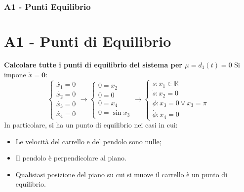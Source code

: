\documentclass{beamer}
\begin{document}
\begin{frame}
	\frametitle{A1 - Punti Equilibrio}%
	\section{A1 - Punti di Equilibrio}%
	\textbf{Calcolare tutte i punti di equilibrio del sistema per \(\mu = d_{1}{(t)} = 0\)}
	Si impone \(\dot{x}=\textbf{0}\):
	\begin{equation*}
		\begin{cases}
			\dot{x_{1}}=0 \\
			\dot{x_{2}}=0 \\
			\dot{x_{3}}=0 \\
			\dot{x_{4}}=0
		\end{cases}
		\rightarrow
		\begin{cases}
			0=x_{2} \\
			0=0     \\
			0=x_{4} \\
			0=\sin{x_{3}}
		\end{cases}
		\rightarrow
		\begin{cases}
			s:x_{1}\in\mathbb{R}        \\
			\dot{s}:x_{2}=0             \\
			\phi:x_{3}=0 \lor x_{3}=\pi \\%
			\dot{\phi}:x_{4}=0
		\end{cases}
	\end{equation*}
	In particolare, si ha un punto di equilibrio nei casi in cui:\begin{itemize}
		\item Le velocità del carrello e del pendolo sono nulle;
		\item Il pendolo è perpendicolare al piano.
		\item Qualisiasi posizione del piano su cui si muove il carrello è un punto di equilibrio.
	\end{itemize}
\end{frame}
\end{document}
